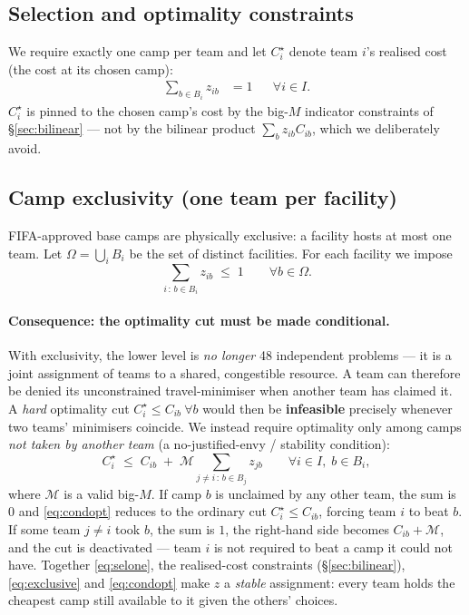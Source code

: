 \documentclass[12pt, letterpaper]{article}
\begin{document}
\subsection{Selection and optimality constraints}
We require exactly one camp per team and let $C_i^\star$ denote team
$i$'s realised cost (the cost at its chosen camp):
\begin{align}
\sum_{b\in B_i} z_{ib} &= 1 &&\forall i\in I.\label{eq:selone}
\end{align}
$C_i^\star$ is pinned to the chosen camp's cost by the big-$M$ indicator
constraints of \S\ref{sec:bilinear} --- not by the bilinear product
$\sum_b z_{ib}C_{ib}$, which we deliberately avoid.

\subsection{Camp exclusivity (one team per facility)}
\label{sec:exclusive}
FIFA-approved base camps are physically exclusive: a facility hosts at
most one team. Let $\Omega=\bigcup_i B_i$ be the set of distinct
facilities. For each facility we impose
\begin{equation}
\sum_{i\,:\,b\in B_i} z_{ib} \;\le\; 1 \qquad\forall b\in\Omega.
\label{eq:exclusive}
\end{equation}

\paragraph{Consequence: the optimality cut must be made conditional.}
With exclusivity, the lower level is \emph{no longer} 48 independent
problems --- it is a joint assignment of teams to a shared, congestible
resource. A team can therefore be denied its unconstrained
travel-minimiser when another team has claimed it. A \emph{hard}
optimality cut $C_i^\star\le C_{ib}\ \forall b$ would then be
\textbf{infeasible} precisely whenever two teams' minimisers coincide.
We instead require optimality only among camps \emph{not taken by another
team} (a no-justified-envy / stability condition):
\begin{equation}
C_i^\star \;\le\; C_{ib} \;+\;
  \mathcal{M}\!\!\sum_{j\neq i\,:\,b\in B_j} z_{jb}
  \qquad\forall i\in I,\;b\in B_i,
\label{eq:condopt}
\end{equation}
where $\mathcal{M}$ is a valid big-$M$. If camp $b$ is unclaimed by any
other team, the sum is $0$ and \eqref{eq:condopt} reduces to the ordinary
cut $C_i^\star\le C_{ib}$, forcing team $i$ to beat $b$. If some team
$j\neq i$ took $b$, the sum is $1$, the right-hand side becomes
$C_{ib}+\mathcal{M}$, and the cut is deactivated --- team $i$ is not
required to beat a camp it could not have. Together
\eqref{eq:selone}, the realised-cost constraints (\S\ref{sec:bilinear}), \eqref{eq:exclusive} and
\eqref{eq:condopt} make $z$ a \emph{stable} assignment: every team holds
the cheapest camp still available to it given the others' choices.
\end{document}
